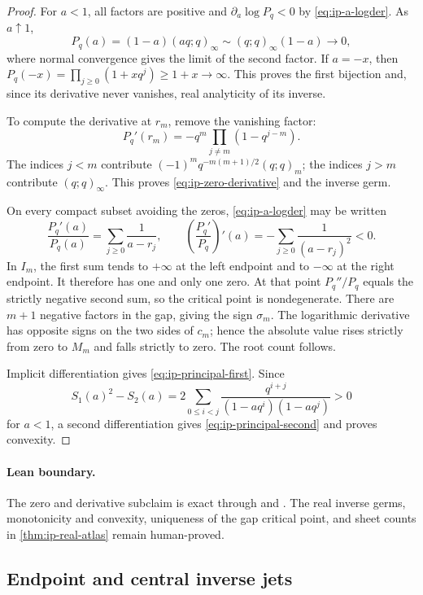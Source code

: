 \begin{proof}
For \(a<1\), all factors are positive and
\(\partial_a\log P_q<0\) by \cref{eq:ip-a-logder}.  As \(a\uparrow1\),
\[
 P_q(a)=(1-a)(aq;q)_\infty
 \sim(q;q)_\infty(1-a)\longrightarrow0,
\]
where normal convergence gives the limit of the second factor.  If \(a=-x\),
then \(P_q(-x)=\prod_{j\geq0}(1+xq^j)\geq1+x\to\infty\).
This proves the first bijection and, since its derivative never vanishes,
real analyticity of its inverse.

To compute the derivative at \(r_m\), remove the vanishing factor:
\[
 P_q'(r_m)=-q^m\prod_{j\ne m}(1-q^{j-m}).
\]
The indices \(j<m\) contribute
\((-1)^mq^{-m(m+1)/2}(q;q)_m\); the indices \(j>m\) contribute
\((q;q)_\infty\).  This proves \cref{eq:ip-zero-derivative} and the inverse
germ.

On every compact subset avoiding the zeros, \cref{eq:ip-a-logder} may be
written
\[
 \frac{P_q'(a)}{P_q(a)}=\sum_{j\geq0}\frac1{a-r_j},\qquad
 \left(\frac{P_q'}{P_q}\right)'(a)
 =-\sum_{j\geq0}\frac1{(a-r_j)^2}<0.
\]
In \(I_m\), the first sum tends to \(+\infty\) at the left endpoint and to
\(-\infty\) at the right endpoint.  It therefore has one and only one zero.
At that point \(P_q''/P_q\) equals the strictly negative second sum, so the
critical point is nondegenerate.  There are \(m+1\) negative factors in the
gap, giving the sign \(\sigma_m\).  The logarithmic derivative has opposite
signs on the two sides of \(c_m\); hence the absolute value rises strictly
from zero to \(M_m\) and falls strictly to zero.  The root count follows.

Implicit differentiation gives \cref{eq:ip-principal-first}.  Since
\[
 S_1(a)^2-S_2(a)
 =2\sum_{0\leq i<j}
 \frac{q^{i+j}}{(1-aq^i)(1-aq^j)}>0
\]
for \(a<1\), a second differentiation gives
\cref{eq:ip-principal-second} and proves convexity.
\end{proof}

\paragraph{Lean boundary.}
The zero and derivative subclaim is exact through
 and
.  The real inverse germs,
monotonicity and convexity, uniqueness of the gap critical point, and sheet
counts in \cref{thm:ip-real-atlas} remain human-proved.

\subsection{Endpoint and central inverse jets}

